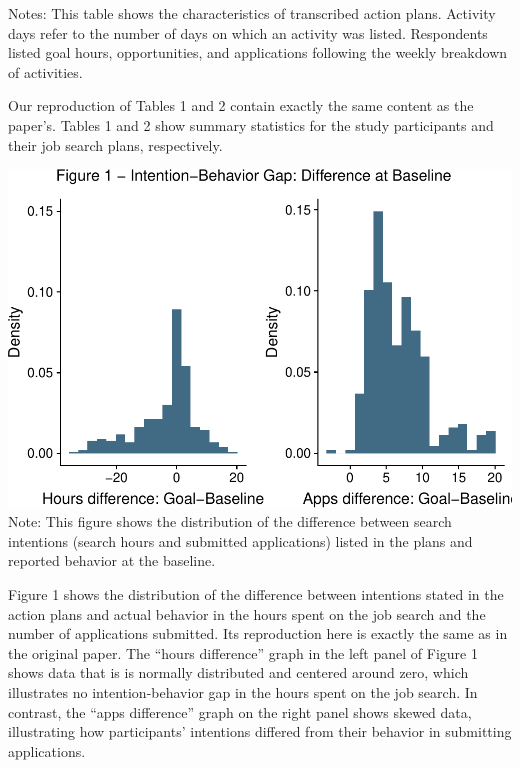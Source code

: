 \documentclass[]{elsarticle} %
\makeatletter
\def\maxwidth{\ifdim\Gin@nat@width>\linewidth\linewidth
\else\Gin@nat@width\fi}
\let\Oldincludegraphics\includegraphics
\renewcommand{\includegraphics}[1]{\Oldincludegraphics[width=\maxwidth]{#1}}
\makeatother
\begin{document}
Notes: This table shows the characteristics of transcribed action plans.
Activity days refer to the number of days on which an activity was
listed. Respondents listed goal hours, opportunities, and applications
following the weekly breakdown of activities.

Our reproduction of Tables 1 and 2 contain exactly the same content as
the paper's. Tables 1 and 2 show summary statistics for the study
participants and their job search plans, respectively.

\includegraphics{project_template_files/figure-latex/figure1-1.pdf}
Note: This figure shows the distribution of the difference between
search intentions (search hours and submitted applications) listed in
the plans and reported behavior at the baseline.

Figure 1 shows the distribution of the difference between intentions
stated in the action plans and actual behavior in the hours spent on the
job search and the number of applications submitted. Its reproduction
here is exactly the same as in the original paper. The ``hours
difference'' graph in the left panel of Figure 1 shows data that is is
normally distributed and centered around zero, which illustrates no
intention-behavior gap in the hours spent on the job search. In
contrast, the ``apps difference'' graph on the right panel shows skewed
data, illustrating how participants' intentions differed from their
behavior in submitting applications.
\end{document}
